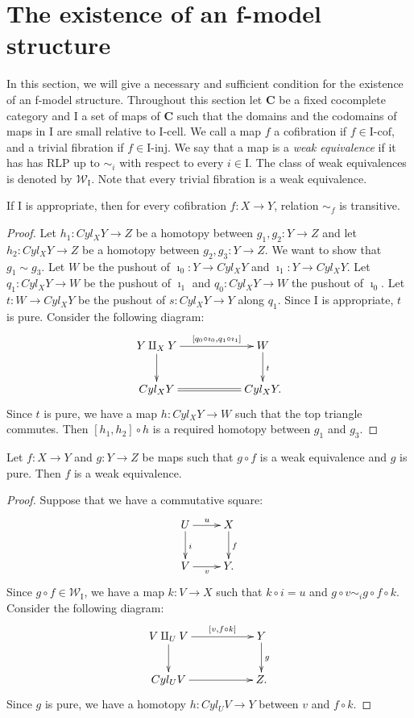 \documentclass{amsart}
\theoremstyle{definition}
\newcommand{\we}{\mathcal{W}}
\newcommand{\cat}[1]{\mathbf{#1}}
\newcommand{\C}{\cat{C}}
\newcommand{\I}{\mathrm{I}}
\newcommand{\class}[2]{#1\text{-}\mathrm{#2}}
\newcommand{\Iinj}[1][\I]{\class{#1}{inj}}
\newcommand{\Icell}[1][\I]{\class{#1}{cell}}
\newcommand{\Icof}[1][\I]{\class{#1}{cof}}
\begin{document}
\section{The existence of an f-model structure}

In this section, we will give a necessary and sufficient
condition for the existence of an f-model structure.
Throughout this section let $\C$ be a fixed cocomplete category and $\I$ a set of maps of $\C$
such that the domains and the codomains of maps in $\I$ are small relative to $\Icell$.
We call a map $f$ a cofibration if $f \in \Icof$, and a trivial fibration if $f \in \Iinj$.
We say that a map is a \emph{weak equivalence} if it has has RLP up to $\sim_i$ with respect to every $i \in \I$.
The class of weak equivalences is denoted by $\we_\I$.
Note that every trivial fibration is a weak equivalence.

\begin{lem}[transitive]
If $\I$ is appropriate, then for every cofibration $f : X \to Y$, relation $\sim_f$ is transitive.
\end{lem}
\begin{proof}
Let $h_1 : Cyl_X Y \to Z$ be a homotopy between $g_1,g_2 : Y \to Z$ and
let $h_2 : Cyl_X Y \to Z$ be a homotopy between $g_2,g_3 : Y \to Z$.
We want to show that $g_1 \sim g_3$.
Let $W$ be the pushout of $\imath_0 : Y \to Cyl_X Y$ and $\imath_1 : Y \to Cyl_X Y$.
Let $q_1 : Cyl_X Y \to W$ be the pushout of $\imath_1$ and $q_0 : Cyl_X Y \to W$ the pushout of $\imath_0$.
Let $t : W \to Cyl_X Y$ be the pushout of $s : Cyl_X Y \to Y$ along $q_1$.
Since $\I$ is appropriate, $t$ is pure.
Consider the following diagram:
\[ \xymatrix{ Y \amalg_X Y \ar[rr]^-{[q_0 \circ \imath_0, q_1 \circ \imath_1]} \ar[d] & & W \ar[d]^t \\
              Cyl_X Y      \ar@{=}[rr]                                                & & Cyl_X Y.
            } \]
Since $t$ is pure, we have a map $h : Cyl_X Y \to W$ such that the top triangle commutes.
Then $[h_1,h_2] \circ h$ is a required homotopy between $g_1$ and $g_3$.
\end{proof}

\begin{lem}
Let $f : X \to Y$ and $g : Y \to Z$ be maps such that $g \circ f$ is a weak equivalence and $g$ is pure.
Then $f$ is a weak equivalence.
\end{lem}
\begin{proof}
Suppose that we have a commutative square:
\[ \xymatrix{ U \ar[r]^u \ar[d]^i & X \ar[d]^f \\
              V \ar[r]_v          & Y.
            } \]
Since $g \circ f \in \we_\I$, we have a map $k : V \to X$ such that $k \circ i = u$ and $g \circ v \sim_i g \circ f \circ k$.
Consider the following diagram:
\[ \xymatrix{ V \amalg_U V \ar[rr]^-{[v, f \circ k]} \ar[d] & & Y \ar[d]^g \\
              Cyl_U V      \ar[rr]                          & & Z.
            } \]
Since $g$ is pure, we have a homotopy $h : Cyl_U V \to Y$ between $v$ and $f \circ k$.
\end{proof}
\end{document}

